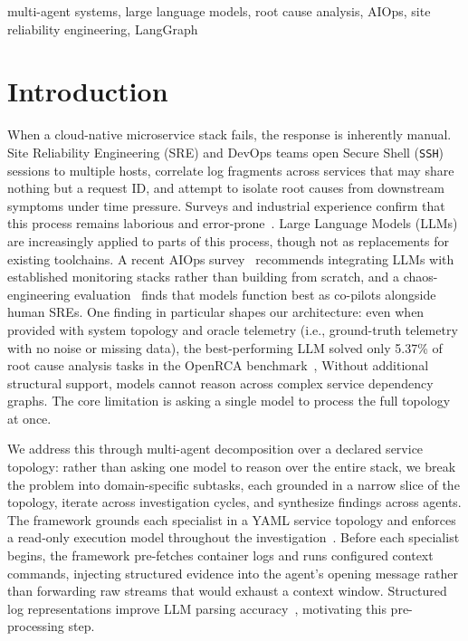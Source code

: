 \documentclass[conference]{IEEEtran}
\begin{document}
\begin{IEEEkeywords}
multi-agent systems, large language models, root cause analysis,
AIOps, site reliability engineering, LangGraph
\end{IEEEkeywords}
\section{Introduction}
When a cloud-native microservice stack fails, the response is
inherently manual. Site Reliability Engineering (SRE) and DevOps
teams open Secure Shell (\texttt{SSH}) sessions to multiple hosts,
correlate log fragments across services that may share nothing but a
request ID, and attempt to isolate root causes from downstream
symptoms under time pressure. Surveys and industrial experience
confirm that this process remains laborious and
error-prone~\cite{zhang2025aiops_survey, chen2024rcacopilot}.
Large Language Models (LLMs) are increasingly applied to parts of
this process, though not as replacements for existing toolchains.
A recent AIOps survey~\cite{zhang2025aiops_survey} recommends
integrating LLMs with established monitoring stacks rather than
building from scratch, and a chaos-engineering
evaluation~\cite{szandala2025aiops_reliability} finds that models
function best as co-pilots alongside human SREs. One finding in particular
shapes our architecture: even when provided with system topology and
oracle telemetry (i.e., ground-truth telemetry with no noise or
missing data), the best-performing LLM solved only 5.37\% of
root cause analysis tasks in the OpenRCA benchmark~\cite{xu2025openrca},
Without additional structural support, models cannot
reason across complex service dependency graphs.
The core limitation is asking a single model to process the full
topology at once.

We address this through multi-agent decomposition over a declared
service topology: rather than asking one model to
reason over the entire stack, we break the problem into
domain-specific subtasks, each grounded in a narrow slice of the
topology, iterate across investigation cycles, and
synthesize findings across agents. The framework grounds each
specialist in a YAML service topology and enforces a read-only
execution model throughout the
investigation~\cite{kholkar2025safeops}. Before each specialist begins, the framework pre-fetches container logs and runs
configured context commands, injecting structured evidence into the agent's opening
message rather than forwarding raw streams that would exhaust a
context window. Structured log representations improve LLM parsing
accuracy~\cite{xu2024divlog}, motivating this pre-processing step.
\end{document}
